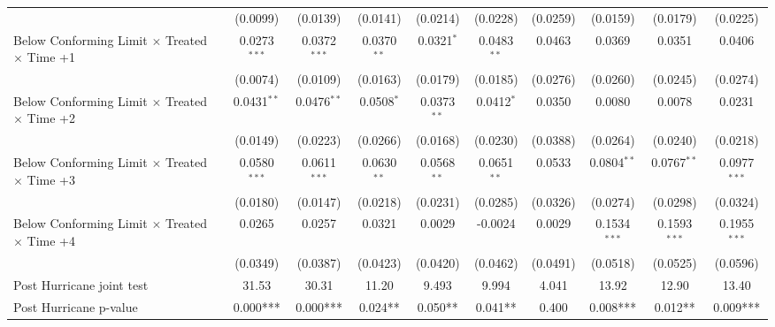 \begin{tabular}{lccccccccc}
                                                              & (0.0099)               & (0.0139)       & (0.0141)      & (0.0214)      & (0.0228)       & (0.0259)     & (0.0159)       & (0.0179)       & (0.0225)\\   
   Below Conforming Limit $\times$ Treated $\times$ Time +1   & 0.0273$^{***}$         & 0.0372$^{***}$ & 0.0370$^{**}$ & 0.0321$^{*}$  & 0.0483$^{**}$  & 0.0463       & 0.0369         & 0.0351         & 0.0406\\   
                                                              & (0.0074)               & (0.0109)       & (0.0163)      & (0.0179)      & (0.0185)       & (0.0276)     & (0.0260)       & (0.0245)       & (0.0274)\\   
   Below Conforming Limit $\times$ Treated $\times$ Time +2   & 0.0431$^{**}$          & 0.0476$^{**}$  & 0.0508$^{*}$  & 0.0373$^{**}$ & 0.0412$^{*}$   & 0.0350       & 0.0080         & 0.0078         & 0.0231\\   
                                                              & (0.0149)               & (0.0223)       & (0.0266)      & (0.0168)      & (0.0230)       & (0.0388)     & (0.0264)       & (0.0240)       & (0.0218)\\   
   Below Conforming Limit $\times$ Treated $\times$ Time +3   & 0.0580$^{***}$         & 0.0611$^{***}$ & 0.0630$^{**}$ & 0.0568$^{**}$ & 0.0651$^{**}$  & 0.0533       & 0.0804$^{**}$  & 0.0767$^{**}$  & 0.0977$^{***}$\\   
                                                              & (0.0180)               & (0.0147)       & (0.0218)      & (0.0231)      & (0.0285)       & (0.0326)     & (0.0274)       & (0.0298)       & (0.0324)\\   
   Below Conforming Limit $\times$ Treated $\times$ Time +4   & 0.0265                 & 0.0257         & 0.0321        & 0.0029        & -0.0024        & 0.0029       & 0.1534$^{***}$ & 0.1593$^{***}$ & 0.1955$^{***}$\\   
                                                              & (0.0349)               & (0.0387)       & (0.0423)      & (0.0420)      & (0.0462)       & (0.0491)     & (0.0518)       & (0.0525)       & (0.0596)\\   
   Post Hurricane joint test                                  & 31.53                  & 30.31          & 11.20         & 9.493         & 9.994          & 4.041        & 13.92          & 12.90          & 13.40\\  
   Post Hurricane p-value                                     & 0.000***               & 0.000***       & 0.024**       & 0.050**       & 0.041**        & 0.400        & 0.008***       & 0.012**        & 0.009***\\  

\end{tabular}
